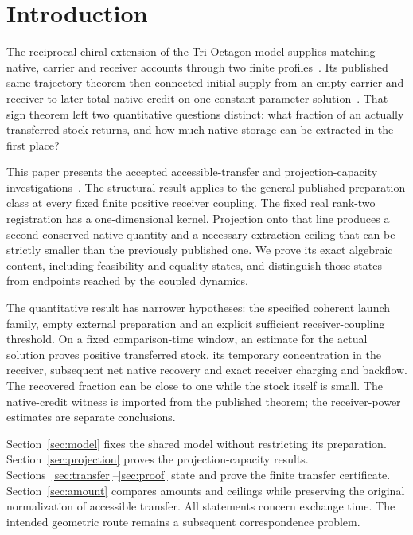 \section{Introduction}\label{sec:introduction}
The reciprocal chiral extension of the Tri-Octagon model supplies matching native, carrier and receiver accounts through two finite profiles~\cite{p1}. Its published same-trajectory theorem then connected initial supply from an empty carrier and receiver to later total native credit on one constant-parameter solution~\cite[Theorem 3.1]{p2}. That sign theorem left two quantitative questions distinct: what fraction of an actually transferred stock returns, and how much native storage can be extracted in the first place?

This paper presents the accepted accessible-transfer and projection-capacity investigations~\cite{at,pc}. The structural result applies to the general published preparation class at every fixed finite positive receiver coupling. The fixed real rank-two registration has a one-dimensional kernel. Projection onto that line produces a second conserved native quantity and a necessary extraction ceiling that can be strictly smaller than the previously published one. We prove its exact algebraic content, including feasibility and equality states, and distinguish those states from endpoints reached by the coupled dynamics.

The quantitative result has narrower hypotheses: the specified coherent launch family, empty external preparation and an explicit sufficient receiver-coupling threshold. On a fixed comparison-time window, an estimate for the actual solution proves positive transferred stock, its temporary concentration in the receiver, subsequent net native recovery and exact receiver charging and backflow. The recovered fraction can be close to one while the stock itself is small. The native-credit witness is imported from the published theorem; the receiver-power estimates are separate conclusions.

Section~\ref{sec:model} fixes the shared model without restricting its preparation. Section~\ref{sec:projection} proves the projection-capacity results. Sections~\ref{sec:transfer}--\ref{sec:proof} state and prove the finite transfer certificate. Section~\ref{sec:amount} compares amounts and ceilings while preserving the original normalization of accessible transfer. All statements concern exchange time. The intended geometric route remains a subsequent correspondence problem.
